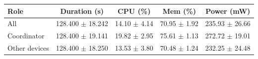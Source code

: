\begin{tabular}{lcccc}
\hline
\textbf{Role} & \textbf{Duration (s)} & \textbf{CPU (\%)} & \textbf{Mem (\%)} & \textbf{Power (mW)} \\
\hline
All & 128.400 $\pm$ 18.242 & 14.10 $\pm$ 4.14 & 70.95 $\pm$ 1.92 & 235.93 $\pm$ 26.66 \\
Coordinator & 128.400 $\pm$ 19.141 & 19.82 $\pm$ 2.95 & 75.61 $\pm$ 1.13 & 272.72 $\pm$ 19.01 \\
Other devices & 128.400 $\pm$ 18.250 & 13.53 $\pm$ 3.80 & 70.48 $\pm$ 1.24 & 232.25 $\pm$ 24.48 \\
\hline
\end{tabular}
